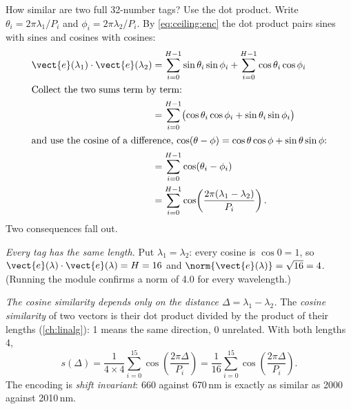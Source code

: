How similar are two full 32-number tags? Use the dot product. Write $\theta_i = 2\pi\lambda_1/P_i$ and $\phi_i = 2\pi\lambda_2/P_i$. By \cref{eq:ceiling:enc} the dot product pairs sines with sines and cosines with cosines:
\begin{align}
  \vect{e}(\lambda_1)\cdot\vect{e}(\lambda_2)
  &= \sum_{i=0}^{H-1}\sin\theta_i\sin\phi_i + \sum_{i=0}^{H-1}\cos\theta_i\cos\phi_i
  \nonumber\\
  \intertext{Collect the two sums term by term:}
  &= \sum_{i=0}^{H-1}\bigl(\cos\theta_i\cos\phi_i + \sin\theta_i\sin\phi_i\bigr)
  \nonumber\\
  \intertext{and use the cosine of a difference, $\cos(\theta-\phi) = \cos\theta\cos\phi + \sin\theta\sin\phi$:}
  &= \sum_{i=0}^{H-1}\cos(\theta_i - \phi_i)
  \nonumber\\
  &= \sum_{i=0}^{H-1}\cos\!\left(\frac{2\pi(\lambda_1-\lambda_2)}{P_i}\right). \label{eq:ceiling:encdot}
\end{align}
Two consequences fall out.

\emph{Every tag has the same length.} Put $\lambda_1 = \lambda_2$: every cosine is $\cos 0 = 1$, so $\vect{e}(\lambda)\cdot\vect{e}(\lambda) = H = 16$ and $\norm{\vect{e}(\lambda)} = \sqrt{16} = 4$. (Running the module confirms a norm of 4.0 for every wavelength.)

\emph{The cosine similarity depends only on the distance $\Delta = \lambda_1 - \lambda_2$.} The \emph{cosine similarity} of two vectors is their dot product divided by the product of their lengths (\cref{ch:linalg}): 1 means the same direction, 0 unrelated. With both lengths 4,
\begin{equation}\label{eq:ceiling:cossim}
  s(\Delta) = \frac{1}{4\times4}\sum_{i=0}^{15}\cos\!\left(\frac{2\pi\Delta}{P_i}\right) = \frac{1}{16}\sum_{i=0}^{15}\cos\!\left(\frac{2\pi\Delta}{P_i}\right).
\end{equation}
The encoding is \emph{shift invariant}: 660 against 670\,nm is exactly as similar as 2000 against 2010\,nm.


